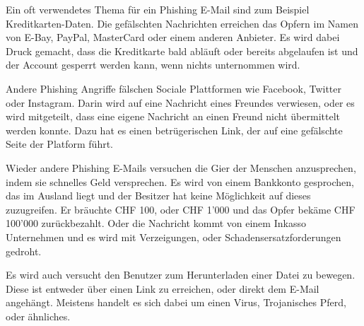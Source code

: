 Ein oft verwendetes Thema für ein Phishing E-Mail sind zum Beispiel Kreditkarten-Daten. Die gefälschten Nachrichten erreichen das Opfern im Namen von E-Bay, PayPal, MasterCard oder einem anderen Anbieter. Es wird dabei Druck gemacht, dass die Kreditkarte bald abläuft oder bereits abgelaufen ist und der Account gesperrt werden kann, wenn nichts unternommen wird. 

Andere Phishing Angriffe fälschen Sociale Plattformen wie Facebook, Twitter oder Instagram. Darin wird auf eine Nachricht eines Freundes verwiesen, oder es wird mitgeteilt, dass eine eigene Nachricht an einen Freund nicht übermittelt werden konnte. Dazu hat es einen betrügerischen Link, der auf eine gefälschte Seite der Platform führt.

Wieder andere Phishing E-Mails versuchen die Gier der Menschen anzusprechen, indem sie schnelles Geld versprechen. Es wird von einem Bankkonto gesprochen, das im Ausland liegt und der Besitzer hat keine Möglichkeit auf dieses zuzugreifen. Er bräuchte CHF 100, oder CHF 1'000 und das Opfer bekäme CHF 100'000 zurückbezahlt. Oder die Nachricht kommt von einem Inkasso Unternehmen und es wird mit Verzeigungen, oder Schadensersatzforderungen gedroht.

Es wird auch versucht den Benutzer zum Herunterladen einer Datei zu bewegen. Diese ist entweder über einen Link zu erreichen, oder direkt dem E-Mail angehängt. Meistens handelt es sich dabei um einen Virus, Trojanisches Pferd, oder ähnliches. 

